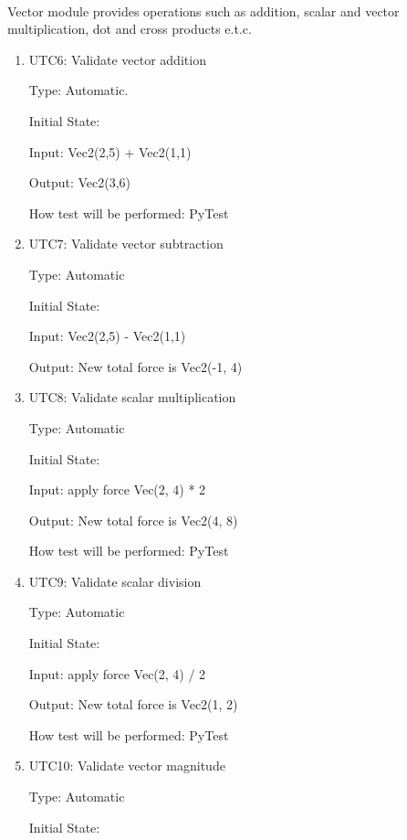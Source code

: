 \documentclass[12pt, titlepage]{article}
\begin{document}
\paragraph{}
Vector module provides operations such as addition, scalar and vector multiplication, dot and cross products e.t.c.
\begin{enumerate}
	
	\item{UTC6}{: Validate vector addition \\}
	
	Type: Automatic.
	
	Initial State: 
	
	Input: Vec2(2,5) + Vec2(1,1)
	
	Output: Vec2(3,6)
	
	How test will be performed: PyTest 
	
	\item{UTC7}{: Validate vector subtraction\\}
	
	Type: Automatic
	
	Initial State: 
	
	Input: Vec2(2,5) - Vec2(1,1)
	
	Output: New total force is Vec2(-1, 4)
	
	\item{UTC8}{: Validate scalar multiplication\\}
	
	Type: Automatic
	
	Initial State: 
	
	Input: apply force Vec(2, 4) * 2
	
	Output: New total force is Vec2(4, 8)
	
	How test will be performed: PyTest
	
	\item{UTC9}{: Validate scalar division\\}
	
	Type: Automatic
	
	Initial State: 
	
	Input: apply force Vec(2, 4) / 2
	
	Output: New total force is Vec2(1, 2)
	
	How test will be performed: PyTest
	
	\item{UTC10}{: Validate vector magnitude\\}
	
	Type: Automatic
	
	Initial State: 
	

\end{enumerate}
\end{document}
